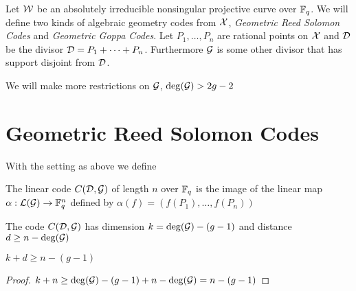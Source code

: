 Let $\mathcal{W}$ be an absolutely irreducible nonsingular projective curve over $\mathbb{F}_q$. We will define two kinds of algebraic geometry codes from $\mathcal{X}$, \textit{Geometric Reed Solomon Codes} and \textit{Geometric Goppa Codes}. Let $P_1,\dots, P_n$ are rational points on $\mathcal{X}$ and $\mathcal{D}$ be the divisor $\mathcal{D}=P_1+\dots +P_n$. Furthermore $\mathcal{G}$ is some other divisor that has support disjoint from $\mathcal{D}$. 
\begin{remark}
	We will make more restrictions on $\mathcal{G}$, $\deg(\mathcal{G})>2g-2$
\end{remark}
\section{Geometric Reed Solomon Codes}
With the setting as above we define 
\begin{definition}
	The linear code $C(\mathcal{D},\mathcal{G})$ of length $n$ over $\mathbb{F}_q$ is the image of the linear map $\alpha:\mathcal{L}(\mathcal{G})\to \mathbb{F}_q^n$ defined by $\alpha(f)=(f(P_1),\dots, f(P_n))$
\end{definition}
\begin{theorem}
	The code $C(\mathcal{D},\mathcal{G})$ has dimension $k=\deg(\mathcal{G})-(g-1)$ and distance $d\geq n-\deg(\mathcal{G})$
\end{theorem}
\begin{corollary}
	$k+d\geq n-(g-1)$ 
\end{corollary}
\begin{proof}
	$k+n\geq \deg(\mathcal{G})-(g-1) +  n-\deg(\mathcal{G})=n-(g-1)$
\end{proof}